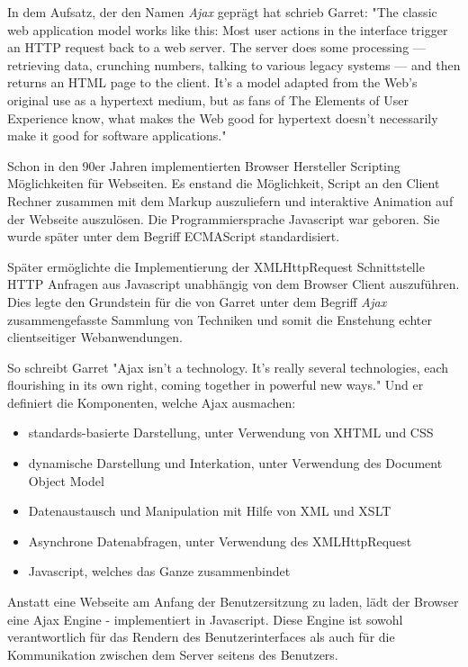 In dem Aufsatz, der den Namen \emph{Ajax} geprägt hat schrieb Garret: "The classic web application model works like this: Most user actions in the interface trigger an HTTP request back to a web server. The server does some processing — retrieving data, crunching numbers, talking to various legacy systems — and then returns an HTML page to the client. It’s a model adapted from the Web’s original use as a hypertext medium, but as fans of The Elements of User Experience know, what makes the Web good for hypertext doesn’t necessarily make it good for software applications."

Schon in den 90er Jahren implementierten Browser Hersteller Scripting Möglichkeiten
für Webseiten. Es enstand die Möglichkeit, Script an den Client Rechner zusammen mit dem Markup auszuliefern und interaktive Animation auf der Webseite auszulösen. Die Programmiersprache Javascript war geboren. Sie wurde später unter dem Begriff ECMAScript standardisiert.

Später ermöglichte die Implementierung der XMLHttpRequest Schnittstelle HTTP Anfragen aus Javascript unabhängig von dem Browser Client auszuführen. Dies legte den Grundstein für die von Garret unter dem Begriff \emph{Ajax} zusammengefasste Sammlung von Techniken und somit die Enstehung echter clientseitiger Webanwendungen.

So schreibt Garret "Ajax isn’t a technology. It’s really several technologies, each flourishing in its own right, coming together in powerful new ways." Und er definiert die Komponenten, welche Ajax ausmachen:

\begin{itemize} 
\item standards-basierte Darstellung, unter Verwendung von XHTML und CSS 
\item dynamische Darstellung und Interkation, unter Verwendung des Document Object Model
\item Datenaustausch und Manipulation mit Hilfe von XML und XSLT
\item Asynchrone Datenabfragen, unter Verwendung des XMLHttpRequest
\item Javascript, welches das Ganze zusammenbindet
\end{itemize}

Anstatt eine Webseite am Anfang der Benutzersitzung zu laden, lädt der Browser eine Ajax Engine - implementiert in Javascript. Diese Engine ist sowohl verantwortlich für das Rendern des Benutzerinterfaces als auch für die Kommunikation zwischen dem Server seitens des Benutzers. 

